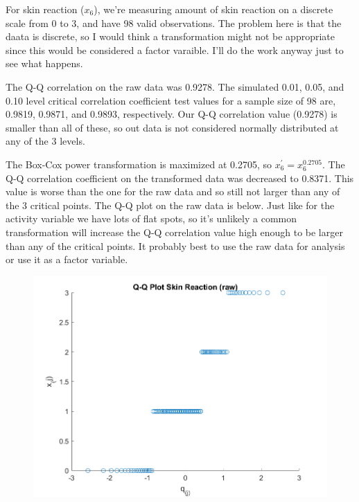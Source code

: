 For skin reaction ($x_{6}$), we're measuring amount of skin reaction on a discrete scale from 0 to 3, and have 98 valid observations. The problem here is that the daata is discrete, so I would think a transformation might not be appropriate since this would be considered a factor varaible. I'll do the work anyway just to see what happens.

The Q-Q correlation on the raw data was 0.9278. The simulated 0.01, 0.05, and 0.10 level critical correlation coefficient test values for a sample size of 98 are, 0.9819, 0.9871, and 0.9893, respectively. Our Q-Q correlation value (0.9278) is smaller than all of these, so out data is not considered normally distributed at any of the 3 levels.

The Box-Cox power transformation is maximized at 0.2705, so $x_{6}^{\prime} = x_{6}^{0.2705}$. The Q-Q correlation coefficient on the transformed data was decreased to 0.8371. This value is worse than the one for the raw data and so still not larger than any of the 3 critical points. The Q-Q plot on the raw data is below. Just like for the activity variable we have lots of flat spots, so it's unlikely a common transformation will increase the Q-Q correlation value high enough to be larger than any of the critical points. It probably best to use the raw data for analysis or use it as a factor variable.

\begin{center}
    \begin{figure}[H]
        \centering
        \includegraphics[scale=0.6]{./matlab/chapter-4/sol4.32.qq.6.png}
    \end{figure}
\end{center}
